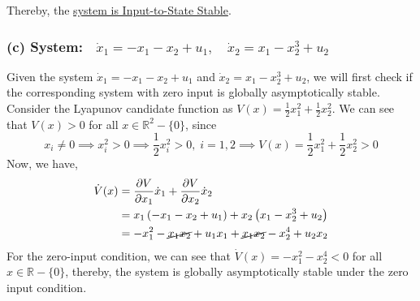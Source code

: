 Thereby, the \underline{system is Input-to-State Stable}.

\subsubsection*{(c) System:\( \quad \dot{x}_{1}=-x_{1}-x_{2}+u_{1}, \quad \dot{x}_{2}=x_{1}-x_{2}^{3}+u_{2} \)}

Given the system \( \dot{x}_{1}=-x_{1}-x_{2}+u_{1} \) and \( \dot{x}_{2}=x_{1}-x_{2}^{3}+u_{2} \), we will first check if the corresponding system with zero input is globally asymptotically stable.
Consider the Lyapunov candidate function as \( V(x)=\frac{1}{2} x_{1}^{2}+\frac{1}{2} x_{2}^{2} \).
We can see that \( V(x) > 0 \) for all \( x \in \mathbb{R}^2 - \{ 0 \} \), since
\begin{equation*}
    x_i \neq 0
    \implies
    x_i^2 > 0
    \implies
    \frac{1}{2} x_i^2 > 0,
    \;
    i = 1, 2
    \implies
    V(x)
    =
    \frac{1}{2} x_1^2 + \frac{1}{2} x_2^2
    > 0
\end{equation*}
Now, we have,
\begin{align*}
    \dot{V}(x)
     & =
    \frac{\partial V}{\partial x_1} \dot{x}_1 + \frac{\partial V}{\partial x_2} \dot{x}_2
    \\
     & =
    x_1 \left( -x_1 - x_2 + u_1 \right) + x_2 \left( x_1 - x_2^3 + u_2 \right)
    \\
     & =
    -x_1^2 - \cancel{x_1 x_2} + u_1 x_1 + \cancel{x_1 x_2} - x_2^4 + u_2 x_2
\end{align*}
For the zero-input condition, we can see that \( \dot{V}(x) = -x_1^2 - x_2^4 < 0 \) for all \( x \in \mathbb{R} - \{ 0 \} \), thereby, the system is globally asymptotically stable under the zero input condition.
